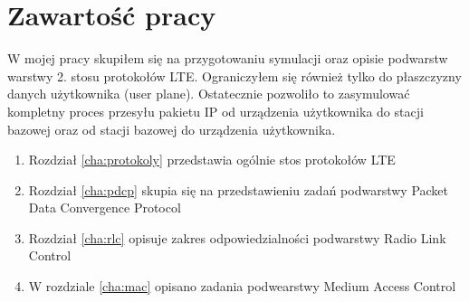\section{Zawartość pracy}
\label{sec:zawartoscPracy}

W mojej pracy skupiłem się na przygotowaniu symulacji oraz opisie podwarstw warstwy 2. stosu protokołów LTE. Ograniczyłem się również tylko do płaszczyzny danych użytkownika (user plane). Ostatecznie pozwoliło to zasymulować kompletny proces przesyłu pakietu IP od urządzenia użytkownika do stacji bazowej oraz od stacji bazowej do urządzenia użytkownika.

\begin{enumerate}%

\item Rozdział \ref{cha:protokoly} przedstawia ogólnie stos protokołów LTE
\item Rozdział \ref{cha:pdcp} skupia się na przedstawieniu zadań podwarstwy Packet Data Convergence Protocol
\item Rozdział \ref{cha:rlc} opisuje zakres odpowiedzialności podwarstwy Radio Link Control
\item W rozdziale \ref{cha:mac} opisano zadania podwearstwy Medium Access Control

\end{enumerate}
